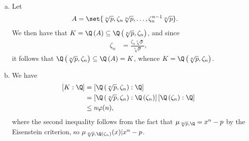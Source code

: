 \documentclass[10pt]{mypackage}
\begin{document}
\begin{solution}\hfill
  \begin{enumerate}[(a)]
    \item Let
      \begin{align*}
        A &= \set{\sqrt[n]{p},\zeta_n\sqrt[n]{p},\dots,\zeta_n^{n-1}\sqrt[n]{p}}.
      \end{align*}
      We then have that $K = \Q\left( A \right)\subseteq \Q\left( \sqrt[n]{p},\zeta_n \right)$, and since
      \begin{align*}
        \zeta_n &= \frac{\zeta_n\sqrt[n]{p}}{\sqrt[n]{p}},
      \end{align*}
      it follows that $\Q\left( \sqrt[n]{p},\zeta_n \right)\subseteq \Q\left( A \right) = K$, whence $K = \Q\left( \sqrt[n]{p},\zeta_n \right)$.
    \item We have
      \begin{align*}
        \left[ K:\Q \right] &= \left[ \Q\left( \sqrt[n]{p},\zeta_n \right):\Q \right]\\
                            &= \left[ \Q\left( \sqrt[n]{p},\zeta_n \right):\Q\left( \zeta_n \right) \right]\left[ \Q\left( \zeta_n \right):\Q \right]\\
                            &\leq n\varphi(n),
      \end{align*}
      where the second inequality follows from the fact that $\mu_{\sqrt[n]{p},\Q} = x^{n} - p$ by the Eisenstein criterion, so $\mu_{\sqrt[n]{p},\Q\left( \zeta_n \right)}(x) | x^{n} - p$.


\end{enumerate}
\end{solution}
\end{document}
